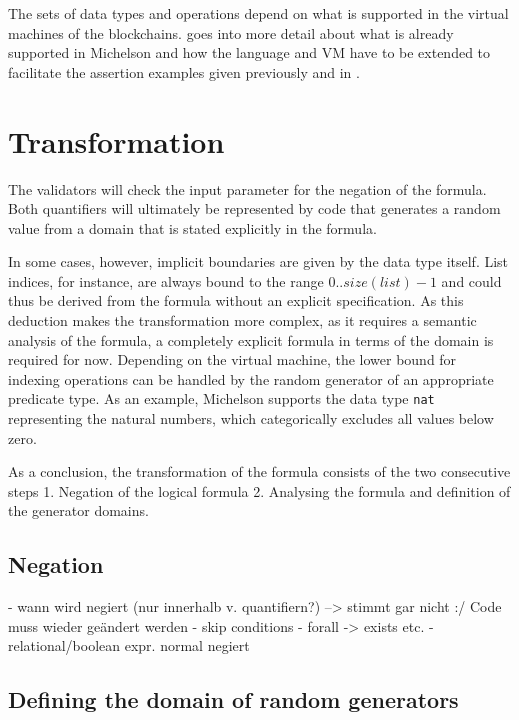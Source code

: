 The sets of data types and operations depend on what is supported in the virtual machines of the blockchains.  goes into more detail about what is already supported in Michelson and how the language and VM have to be extended to facilitate the assertion examples given previously and in .

\section{Transformation}\label{sec:transformation}
The validators will check the input parameter for the negation of the formula. Both quantifiers will ultimately be represented by code that generates a random value from a domain that is stated explicitly in the formula. %

In some cases, however, implicit boundaries are given by the data type itself. List indices, for instance, are always bound to the range $0.. size(list) - 1$ and could thus be derived from the formula without an explicit specification. As this deduction makes the transformation more complex, as it requires a semantic analysis of the formula, a completely explicit formula in terms of the domain is required for now. Depending on the virtual machine, the lower bound for indexing operations can be handled by the random generator of an appropriate predicate type. As an example, Michelson supports the data type \texttt{nat} representing the natural numbers, which categorically excludes all values below zero. 

As a conclusion, the transformation of the formula consists of the two consecutive steps
1. Negation of the logical formula
2. Analysing the formula and definition of the generator domains.

\subsection{Negation}
- wann wird negiert (nur innerhalb v. quantifiern?) --> stimmt gar nicht :/ Code muss wieder geändert werden
- skip conditions
- forall -> exists etc.
- relational/boolean expr. normal negiert

\subsection{Defining the domain of random generators}

